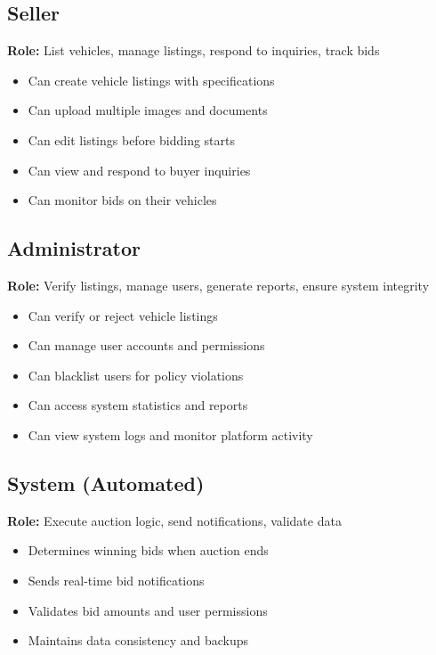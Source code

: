 \subsection{Seller}
\textbf{Role:} List vehicles, manage listings, respond to inquiries, track bids
\begin{itemize}
    \item Can create vehicle listings with specifications
    \item Can upload multiple images and documents
    \item Can edit listings before bidding starts
    \item Can view and respond to buyer inquiries
    \item Can monitor bids on their vehicles
\end{itemize}

\subsection{Administrator}
\textbf{Role:} Verify listings, manage users, generate reports, ensure system integrity
\begin{itemize}
    \item Can verify or reject vehicle listings
    \item Can manage user accounts and permissions
    \item Can blacklist users for policy violations
    \item Can access system statistics and reports
    \item Can view system logs and monitor platform activity
\end{itemize}

\subsection{System (Automated)}
\textbf{Role:} Execute auction logic, send notifications, validate data
\begin{itemize}
    \item Determines winning bids when auction ends
    \item Sends real-time bid notifications
    \item Validates bid amounts and user permissions
    \item Maintains data consistency and backups
\end{itemize}

